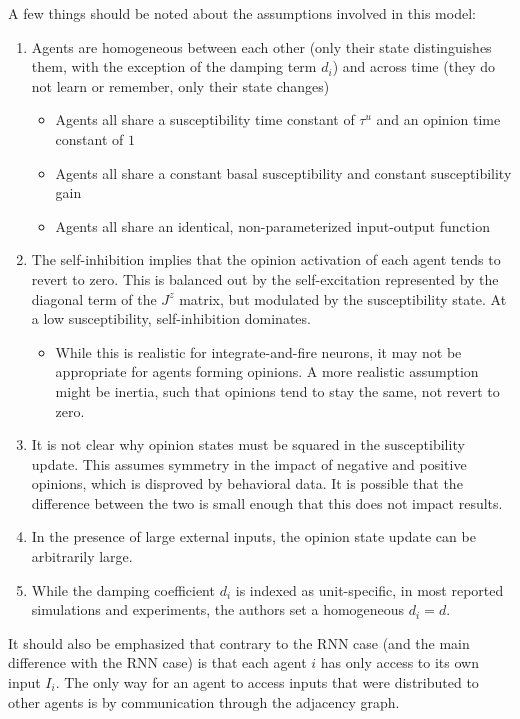 \documentclass[]{article}
\begin{document}
A few things should be noted about the assumptions involved in this model:
\begin{enumerate}
	\item Agents are homogeneous between each other (only their state distinguishes them, with the exception of the damping term $d_i$) and across time (they do not learn or remember, only their state changes)
	\begin{itemize}
		\item Agents all share a susceptibility time constant of $\tau^u$ and an opinion time constant of $1$ 
		\item Agents all share a constant basal susceptibility and constant susceptibility gain
		\item Agents all share an identical, non-parameterized input-output function 
	\end{itemize}
	\item The self-inhibition implies that the opinion activation of each agent tends to revert to zero. This is balanced out by the self-excitation represented by the diagonal term of the $J^z$ matrix, but modulated by the susceptibility state. At a low susceptibility, self-inhibition dominates. 
	\begin{itemize}
		\item While this is realistic for integrate-and-fire neurons, it may not be appropriate for agents forming opinions. A more realistic assumption might be inertia, such that opinions tend to stay the same, not revert to zero.
	\end{itemize}
	\item It is not clear why opinion states must be squared in the susceptibility update. This assumes symmetry in the impact of negative and positive opinions, which is disproved by behavioral data. It is possible that the difference between the two is small enough that this does not impact results. 
	\item In the presence of large external inputs, the opinion state update can be arbitrarily large.
	\item While the damping coefficient $d_i$ is indexed as unit-specific, in most reported simulations and experiments, the authors set a homogeneous $d_i=d$. 
\end{enumerate}

It should also be emphasized that contrary to the RNN case (and the main difference with the RNN case) is that each agent $i$ has only access to its own input $I_i$. The only way for an agent to access inputs that were distributed to other agents is by communication through the adjacency graph.
\end{document}
